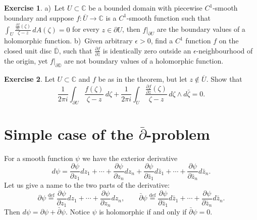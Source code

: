 \documentclass[12pt,openany]{book}
\newcommand{\C}{{\mathbb{C}}}
\newcommand{\D}{{\mathbb{D}}}
\theoremstyle{plain}
\theoremstyle{remark}
\theoremstyle{definition}
\newenvironment{exbox}{%
    \def\FrameCommand{\vrule width 1pt \relax\hspace {10pt}}%
    \MakeFramed {\advance \hsize -\width \FrameRestore }%
}{%
    \endMakeFramed
}
\theoremstyle{exercise}
\newtheorem{exercise}{Exercise}[section]
\theoremstyle{example}
\begin{document}
\begin{exbox}
\begin{exercise}
a)~Let $U \subset \C$ be a bounded domain with piecewise $C^1$-smooth boundary and
suppose $f \colon \overline{U} \to \C$ is a $C^1$-smooth function such
that 
$\int_{U} \frac{\frac{\partial f}{\partial \bar{z}}(\zeta)}{\zeta-z} \,
dA(\zeta) =
0$ for every $z \in \partial U$, then $f|_{\partial U}$ are the boundary
values of a holomorphic function.
b)~Given arbitrary $\epsilon > 0$, find a $C^1$ function $f$ on the closed unit disc
$\overline{\D}$,
such that $\frac{\partial f}{\partial \bar{z}}$ is identically zero
outside an $\epsilon$-neighbourhood of the origin, yet $f|_{\partial \D}$
are not boundary values of a holomorphic function.
\end{exercise}

\begin{exercise}
Let $U \subset \C$ and $f$ be as in the theorem, but let $z \notin
\overline{U}$.  Show that
\begin{equation*}
\frac{1}{2\pi i}
\int_{\partial U}
\frac{f(\zeta)}{\zeta-z}
\,
d \zeta
+
\frac{1}{2\pi i}
\int_{U}
\frac{\frac{\partial f}{\partial \bar{z}}(\zeta)}{\zeta-z}
\,
d\zeta \wedge d\bar{\zeta} 
= 0 .
\end{equation*}
\end{exercise}
\end{exbox}


\section{Simple case of the \texorpdfstring{$\bar{\partial}$}{dbar}-problem}

For a smooth function $\psi$ we have the exterior derivative
\begin{equation*}
d \psi =
\frac{\partial \psi}{\partial z_1} dz_1 + \cdots +
\frac{\partial \psi}{\partial z_n} dz_n
+
\frac{\partial \psi}{\partial \bar{z}_1} d\bar{z}_1 + \cdots +
\frac{\partial \psi}{\partial \bar{z}_n} d\bar{z}_n .
\end{equation*}
Let us give a name to the two parts of the derivative:
\begin{equation*}
\partial \psi \overset{\text{def}}{=}
\frac{\partial \psi}{\partial z_1} dz_1 + \cdots +
\frac{\partial \psi}{\partial z_n} dz_n, \qquad
\bar{\partial} \psi \overset{\text{def}}{=}
\frac{\partial \psi}{\partial \bar{z}_1} d\bar{z}_1 + \cdots +
\frac{\partial \psi}{\partial \bar{z}_n} d\bar{z}_n .
\end{equation*}
Then $d \psi = \partial \psi + \bar{\partial} \psi$.
Notice $\psi$ is holomorphic if and only if $\bar{\partial} \psi = 0$.
\end{document}
